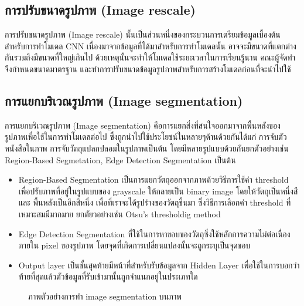 \documentclass[12pt,oneside,openright,a4paper]{cpe-thai-project}
\begin{document}
\subsection{การปรับขนาดรูปภาพ (Image rescale)\cite{Imagepre}}
การปรับขนาดรูปภาพ (Image rescale) นั้นเป็นส่วนหนึ่งของกระบวนการเตรียมข้อมูลเบื้องต้นสำหรับการทำโมเดล CNN 
เนื่องมาจากข้อมูลที่ได้มาสำหรับการทำโมเดลนั้น อาจจะมีขนาดที่แตกต่างกันรวมถึงมีขนาดที่ใหญ่เกินไป ด้วยเหตุนั้นจะทำให้โมเดลใช้ระยะเวลาในการเรียนรู้นาน 
คณะผู้จัดทำจึงกำหนดขนาดมาตรฐาน และทำการปรับขนาดข้อมูลรูปภาพสำหรับการสร้างโมเดลก่อนที่จะนำไปใช้

\subsection{การแยกบริเวณรูปภาพ (Image segmentation)\cite{Imagesegment}}
การแยกบริเวณรูปภาพ (Image segmentation) คือการแยกสิ่งที่สนใจออกมาจากพื้นหลังของรูปภาพเพื่อใช้ในการทำโมเดลต่อไป ซึ่งถูกนำไปใช้ประโยชน์ในหลายๆด้านด้วยกันได้แก่ 
การจับตัวหนังสือในภาพ การจับวัตถุแปลกปลอมในรูปภาพเป็นต้น โดยมีหลายรูปแบบด้วยกันยกตัวอย่างเช่น Region-Based Segmetation, Edge Detection Segmentation เป็นต้น
\begin{itemize}
  \item Region-Based Segmentation เป็นการแยกวัตถุออกจากภาพด้วยวิธีการใช้ค่า threshold เพื่อปรับภาพที่อยู่ในรูปแบบของ grayscale ให้กลายเป็น binary image โดยให้วัตถุเป็นหนึ่งสี และ พื้นหลังเป็นอีกสีหนึ่ง เพื่อที่เราจะได้รูปร่างของวัตถุขึ้นมา ซึ่งวิธีการเลือกค่า threshold ที่เหมาะสมมีมากมาย ยกตัยวอย่างเช่น Otsu’s thresholdig method

  \item Edge Detection Segmentation ที่ใช้ในการหาขอบของวัตถุซึ่งใช้หลักการความไม่ต่อเนื่องภายใน pixel ของรูปภาพ โดยจุดที่เกิดการเปลี่ยนแปลงนั้นจะถูกระบุเป็นจุดขอบ 
  \item Output layer เป็นชั้นสุดท้ายมีหน้าที่สำหรับรับข้อมูลจาก Hidden Layer เพื่อใช้ในการบอกว่าท้ายที่สุดแล้วตัวข้อมูลที่รับเข้ามานั้นถูกจำแนกอยู่ในประเภทใด
\end{itemize}
\begin{figure}[!ht]\centering
  \setlength{\fboxrule}{0.2mm} %
  \setlength{\fboxsep}{1cm}
  \caption{ภาพตัวอย่างการทำ image segmentation บนภาพ}\label{fig:imagesegment}
\end{figure}
\end{document}
